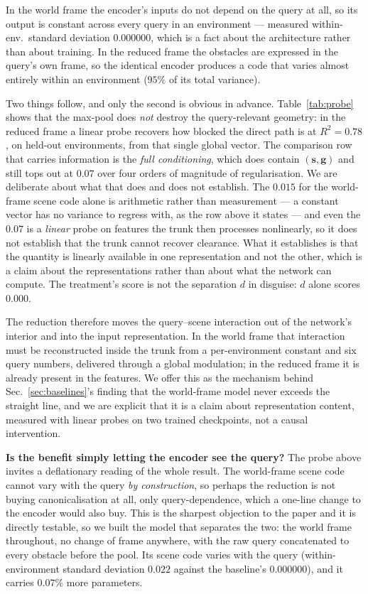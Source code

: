 \documentclass[10pt,twocolumn,letterpaper]{article}
\theoremstyle{plain}
\newcommand{\svec}{\mathbf{s}}
\newcommand{\gvec}{\mathbf{g}}
\begin{document}
In the world frame the encoder's inputs do not depend on the query at all, so its
output is constant across every query in an environment --- measured within-env.\
standard deviation $0.000000$, which is a fact about the architecture rather than
about training. In the reduced frame the obstacles are expressed in the query's
own frame, so the identical encoder produces a code that varies almost entirely
within an environment ($95\%$ of its total variance).

Two things follow, and only the second is obvious in advance.
Table~\ref{tab:probe} shows that the max-pool does \emph{not} destroy the
query-relevant geometry: in the reduced frame a linear probe recovers how blocked
the direct path is at $R^2=0.78$, on held-out environments, from that single
global vector. The comparison row that carries information is the
\emph{full conditioning}, which does contain $(\svec,\gvec)$ and still tops out
at $0.07$ over four orders of magnitude of regularisation. We are deliberate
about what that does and does not establish. The $0.015$ for the world-frame
scene code alone is arithmetic rather than measurement --- a constant vector has
no variance to regress with, as the row above it states --- and even the $0.07$
is a \emph{linear} probe on features the trunk then processes nonlinearly, so it
does not establish that the trunk cannot recover clearance. What it establishes
is that the quantity is linearly available in one representation and not the
other, which is a claim about the representations rather than about what the
network can compute. The treatment's score is not the separation $d$ in disguise:
$d$ alone scores $0.000$.

The reduction therefore moves the query--scene interaction out of the network's
interior and into the input representation. In the world frame that interaction
must be reconstructed inside the trunk from a per-environment constant and six
query numbers, delivered through a global modulation; in the reduced frame it is
already present in the features. We offer this as the mechanism behind
Sec.~\ref{sec:baselines}'s finding that the world-frame model never exceeds the
straight line, and we are explicit that it is a claim about representation
content, measured with linear probes on two trained checkpoints, not a causal
intervention.

\textbf{Is the benefit simply letting the encoder see the query?} The probe
above invites a deflationary reading of the whole result. The world-frame scene
code cannot vary with the query \emph{by construction}, so perhaps the reduction
is not buying canonicalisation at all, only query-dependence, which a one-line
change to the encoder would also buy. This is the sharpest objection to the paper
and it is directly testable, so we built the model that separates the two: the
world frame throughout, no change of frame anywhere, with the raw query
concatenated to every obstacle before the pool. Its scene code varies with the
query (within-environment standard deviation $0.022$ against the baseline's
$0.000000$), and it carries $0.07\%$ more parameters.
\end{document}
